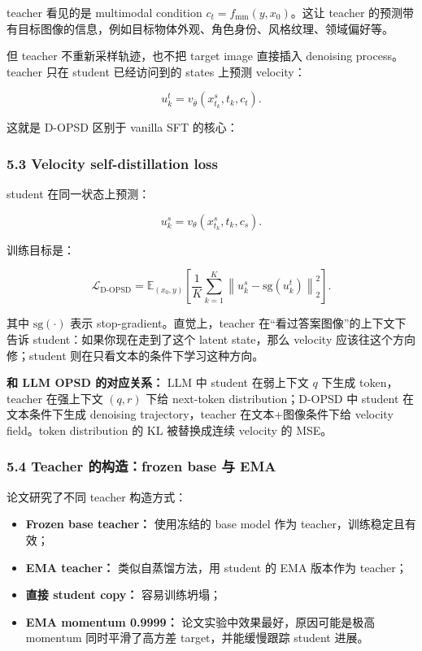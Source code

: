 teacher 看见的是 multimodal condition $c_t=f_{\mathrm{mm}}(y,x_0)$。这让 teacher 的预测带有目标图像的信息，例如目标物体外观、角色身份、风格纹理、领域偏好等。

但 teacher 不重新采样轨迹，也不把 target image 直接插入 denoising process。teacher 只在 student 已经访问到的 states 上预测 velocity：

\[
u_k^t = v_{\bar{\theta}}(x_{t_k}^{s}, t_k, c_t).
\]

这就是 D-OPSD 区别于 vanilla SFT 的核心：

\subsubsection{5.3 Velocity self-distillation loss}

student 在同一状态上预测：

\[
u_k^s = v_\theta(x_{t_k}^{s}, t_k, c_s).
\]

训练目标是：

\[
\mathcal{L}_{\mathrm{D\mbox{-}OPSD}}
=
\mathbb{E}_{(x_0,y)}
\left[
\frac{1}{K}
\sum_{k=1}^{K}
\left\|
 u_k^s - \mathrm{sg}(u_k^t)
\right\|_2^2
\right].
\]

其中 $\mathrm{sg}(\cdot)$ 表示 stop-gradient。直觉上，teacher 在“看过答案图像”的上下文下告诉 student：如果你现在走到了这个 latent state，那么 velocity 应该往这个方向修；student 则在只看文本的条件下学习这种方向。

\begin{intubox}
\textbf{和 LLM OPSD 的对应关系：} LLM 中 student 在弱上下文 $q$ 下生成 token，teacher 在强上下文 $(q,r)$ 下给 next-token distribution；D-OPSD 中 student 在文本条件下生成 denoising trajectory，teacher 在文本+图像条件下给 velocity field。token distribution 的 KL 被替换成连续 velocity 的 MSE。
\end{intubox}

\subsubsection{5.4 Teacher 的构造：frozen base 与 EMA}

论文研究了不同 teacher 构造方式：

\begin{itemize}[leftmargin=1.5em]
  \item \textbf{Frozen base teacher：} 使用冻结的 base model 作为 teacher，训练稳定且有效；
  \item \textbf{EMA teacher：} 类似自蒸馏方法，用 student 的 EMA 版本作为 teacher；
  \item \textbf{直接 student copy：} 容易训练坍塌；
  \item \textbf{EMA momentum 0.9999：} 论文实验中效果最好，原因可能是极高 momentum 同时平滑了高方差 target，并能缓慢跟踪 student 进展。
\end{itemize}

